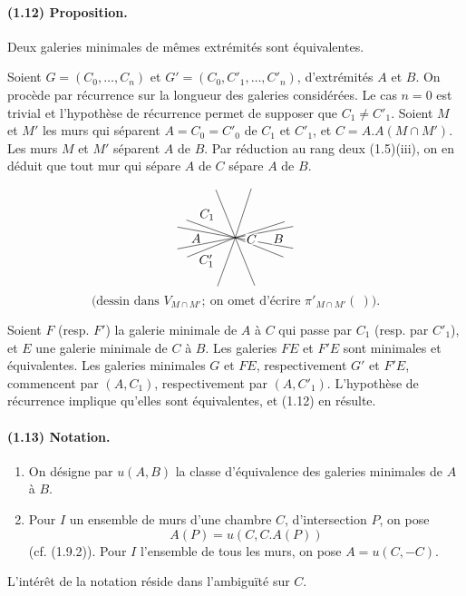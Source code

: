 \documentclass[10pt]{article}
\begin{document}
\paragraph{(1.12) Proposition.} Deux galeries minimales de mêmes extrémités sont équivalentes.

Soient $G=(C_0,\ldots,C_n)$ et $G'=(C_0,C'_1,\ldots,C'_n)$, d'extrémités $A$ et $B$. On procède par récurrence sur la longueur des galeries considérées. Le cas $n=0$ est trivial et l'hypothèse de récurrence permet de supposer que $C_1\ne C'_1$. Soient $M$ et $M'$ les murs qui séparent $A=C_0=C'_0$ de $C_1$ et $C'_1$, et $C=A.A(M\cap M')$. Les murs $M$ et $M'$ séparent $A$ de $B$. Par réduction au rang deux (1.5)(iii), on en déduit que tout mur qui sépare $A$ de $C$ sépare $A$ de $B$.

\[
\begin{tikzpicture}[scale=0.82,baseline={(0,0)}]
\coordinate (O) at (0,0);
\foreach \a in {18,72,112,160,202,250,292,338}
  {\draw ({1.75*cos(\a)},{1.75*sin(\a)})--(O);}
\draw (-1.95,-0.38)--(1.95,0.38);
\draw (-1.95,0.36)--(1.95,-0.36);
\node[fill=white,inner sep=1pt] at (-0.95,0.78) {$C_1$};
\node[fill=white,inner sep=1pt] at (-1.32,-0.02) {$A$};
\node[fill=white,inner sep=1pt] at (0.55,-0.05) {$C$};
\node[fill=white,inner sep=1pt] at (1.45,-0.04) {$B$};
\node[fill=white,inner sep=1pt] at (-0.97,-0.78) {$C'_1$};
\end{tikzpicture}
\]
\[
\text{(dessin dans }V_{M\cap M'};\ \text{on omet d'écrire }\pi'_{M\cap M'}(\ )\text{).}
\]


Soient $F$ (resp. $F'$) la galerie minimale de $A$ à $C$ qui passe par $C_1$ (resp. par $C'_1$), et $E$ une galerie minimale de $C$ à $B$. Les galeries $FE$ et $F'E$ sont minimales et équivalentes. Les galeries minimales $G$ et $FE$, respectivement $G'$ et $F'E$, commencent par $(A,C_1)$, respectivement par $(A,C'_1)$. L'hypothèse de récurrence implique qu'elles sont équivalentes, et (1.12) en résulte.

\paragraph{(1.13) Notation.} \begin{enumerate}[label=(\roman*)]
\item On désigne par $u(A,B)$ la classe d'équivalence des galeries minimales de $A$ à $B$.
\item Pour $I$ un ensemble de murs d'une chambre $C$, d'intersection $P$, on pose
\[
A(P)=u(C,C.A(P))
\]
(cf. (1.9.2)). Pour $I$ l'ensemble de tous les murs, on pose $A=u(C,-C)$.
\end{enumerate}
L'intérêt de la notation réside dans l'ambiguïté sur $C$.
\end{document}
